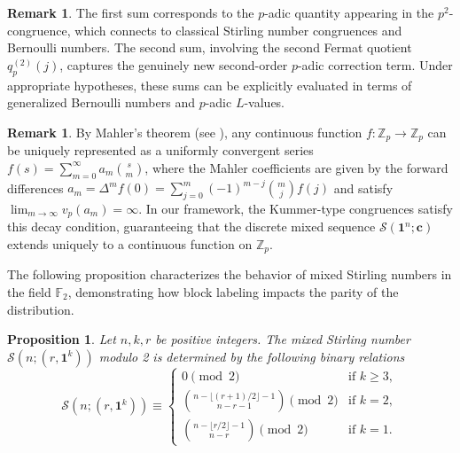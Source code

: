 \documentclass[12pt]{amsart}
\newtheorem{proposition}[theorem]{Proposition}
\theoremstyle{definition}
\newtheorem{remark}[theorem]{Remark}
\begin{document}
\begin{remark}
The first sum corresponds to the $p$-adic quantity appearing in the $p^2$-congruence, which connects to classical Stirling number congruences and Bernoulli numbers. The second sum, involving the second Fermat quotient $q_p^{(2)}(j)$, captures the genuinely new second-order $p$-adic correction term. Under appropriate hypotheses, these sums can be explicitly evaluated in terms of generalized Bernoulli numbers and $p$-adic $L$-values.
\end{remark}
\begin{remark}
By Mahler's theorem (see \cite[Chap.~4]{koblitz}), any continuous function $f: \mathbb{Z}_p \to \mathbb{Z}_p$ can be uniquely represented as a uniformly convergent series $f(s) = \sum_{m=0}^\infty a_m \binom{s}{m}$, where the Mahler coefficients are given by the forward differences $a_m = \Delta^m f(0) = \sum_{j=0}^m (-1)^{m-j} \binom{m}{j} f(j)$ and satisfy $\lim_{m \to \infty} v_p(a_m) = \infty$. In our framework, the Kummer-type congruences satisfy this decay condition, guaranteeing that the discrete mixed sequence $\mathcal{S}(\mathbf{1}^n; \mathbf{c})$ extends uniquely to a continuous function on $\mathbb{Z}_p$. 
\end{remark}
The following proposition characterizes the behavior of mixed Stirling numbers in the field $\mathbb{F}_2$, demonstrating how block labeling impacts the parity of the distribution.
\begin{proposition}
\label{prop:parity_mixed_optimized}
Let $n, k, r$ be positive integers. The mixed Stirling number $\mathcal{S}(n; (r, \mathbf{1}^k))$ modulo 2 is determined by the following binary relations
\begin{equation}
    \mathcal{S}(n; (r, \mathbf{1}^k)) \equiv 
    \begin{cases} 
    0 \pmod{2} & \text{if } k \geq 3, \\
    \binom{n- \lfloor (r+1)/2 \rfloor - 1}{n-r-1} \pmod{2} & \text{if } k = 2, \\
    \binom{n - \lfloor r/2 \rfloor - 1}{n - r} \pmod{2} & \text{if } k = 1.
    \end{cases}
\end{equation}
\end{proposition}
\end{document}
